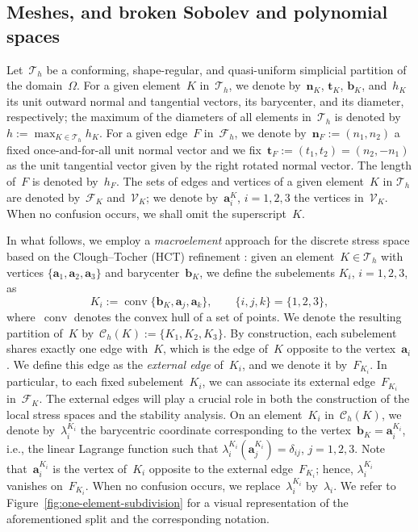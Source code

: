 \documentclass[a4paper,twoside,10pt]{article}
\theoremstyle{plain}
\theoremstyle{remark}
\theoremstyle{definition}
\numberwithin{equation}{section}
\numberwithin{figure}{section}
\newcommand{\Ccalh}{\mathcal{C}_h}
\newcommand{\Tauh}{\mathcal{T}_h}
\newcommand{\K}{K}
\newcommand{\F}{F}
\newcommand{\Fcalh}{\mathcal{F}_h}
\newcommand{\VcalK}{\mathcal{V}_\K}
\newcommand{\FcalK}{\mathcal{F}_\K}
\newcommand{\bbfK}{\mathbf{b}_\K}
\newcommand{\CcalhK}{\Ccalh(\K)}
\newcommand{\lambdai}{\lambda_i}
\newcommand{\lambdaKi}{\lambda^{\Ki}_{i}}
\newcommand{\Ki}{{\K_i}}
\newcommand{\Fi}{{\F_{\Ki}}}
\newcommand{\ncompo}{n_1}
\newcommand{\ncompt}{n_2}
\newcommand{\tcompo}{t_1}
\newcommand{\tcompt}{t_2}
\newcommand{\tangone}{\tcompo}
\newcommand{\tangtwo}{\tcompt}
\newcommand{\nbfK}{\mathbf{n}_\K}
\newcommand{\tbfK}{\mathbf{t}_\K}
\newcommand{\hK}{h_\K}
\newcommand{\nbfF}{\mathbf{n}_\F}
\newcommand{\tbfF}{\mathbf{t}_\F}
\newcommand{\hF}{h_\F}
\newcommand{\Kone}{\K_1}
\newcommand{\Ktwo}{\K_2}
\newcommand{\Kthree}{\K_3}
\DeclareMathOperator{\conv}{conv}
\newcommand{\aKi}{\mathbf{a}^\K_i}
\newcommand{\aKij}{\mathbf{a}^{\Ki}_j}
\newcommand{\aKii}{\mathbf{a}^{\Ki}_i}
\newcommand{\aone}{\mathbf{a}_1}
\newcommand{\atwo}{\mathbf{a}_2}
\newcommand{\athree}{\mathbf{a}_3}
\newcommand{\ai}{\mathbf{a}_i}
\newcommand{\aj}{\mathbf{a}_j}
\newcommand{\ak}{\mathbf{a}_k}
\begin{document}
\subsection{Meshes, and broken Sobolev and polynomial spaces} \label{subsection:meshes}
Let~$\Tauh$ be a conforming, shape-regular, and quasi-uniform simplicial partition of the domain~$\Omega$.
For a given element~$\K$ in~$\Tauh$,
we denote by~$\nbfK$, $\tbfK$, $\bbfK$, and~$\hK$
its unit outward normal and tangential vectors,
its barycenter,
and its diameter, respectively;
the maximum of the diameters of all elements in~$\Tauh$ is denoted by~$h := \max_{\K \in \Tauh}\hK$.
For a given edge~$\F$ in~$\Fcalh$,
we denote by~$\nbfF := (\ncompo,\ncompt)$
a fixed once-and-for-all unit normal vector and
we fix~$\tbfF := (\tangone, \tangtwo) = (\ncompt, -\ncompo)$
as the  unit tangential vector
given by the right rotated normal vector.
The length of~$\F$ is denoted by~$\hF$.
The sets of edges and vertices of a given element~$\K$ in $\Tauh$
are denoted by~$\FcalK$ and~$\VcalK$;
we denote by~$\aKi$, $i=1,2,3$ the vertices in~$\VcalK$.
When no confusion occurs,
we shall omit the superscript~$\K$.

In what follows,
we employ a \emph{macroelement} approach for the discrete stress space
based on the Clough--Tocher (HCT) refinement \cite{Clough-Tocher:1965}:
given an element~$\K\in\Tauh$ with vertices
$\{\aone,\atwo,\athree\}$ and barycenter~$\bbfK$,
we define the subelements $\Ki$, $i=1,2,3$,
as
\begin{equation*}
\Ki := \conv\{\bbfK, \aj, \ak\},
\qquad
\{i,j,k\} = \{1,2,3\},
\end{equation*}
where~$\conv$ denotes the convex hull of a set of points.
We denote the resulting partition of~$\K$
by~$\CcalhK := \{\Kone,\Ktwo,\Kthree\}$.
By construction,
each subelement shares exactly one edge with~$\K$,
which is the edge of~$\K$ opposite to the vertex~$\ai$.
We define this edge as the \emph{external edge} of~$\Ki$,
and we denote it by~$\Fi$.
In particular,
to each fixed subelement~$\Ki$,
we can associate its external edge~$\Fi$ in~$\FcalK$.
The external edges will play a crucial role
in both the construction of the local stress spaces
and the stability analysis.
On an element~$\Ki$ in~$\CcalhK$,
we denote by~$\lambdaKi$ the barycentric coordinate
corresponding to the vertex~$\bbfK = \aKii$, i.e.,
the linear Lagrange function such that
$\lambdaKi(\aKij) = \delta_{ij}$,
$j=1,2,3$.
Note that~$\aKii$ is the vertex of~$\Ki$ opposite to the external edge~$\Fi$;
hence,
$\lambdaKi$ vanishes on~$\Fi$.
When no confusion occurs,
we replace~$\lambdaKi$
by~$\lambdai$.
We refer to Figure~\ref{fig:one-element-subdivision}
for a visual representation of the aforementioned split
and the corresponding notation.
\end{document}
